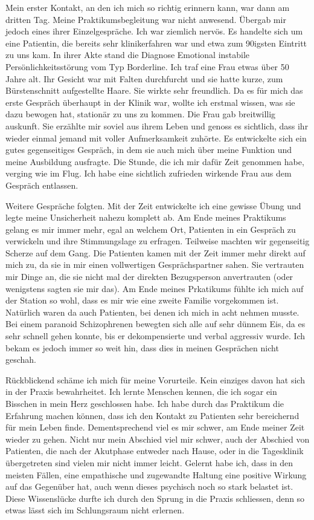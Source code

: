 Mein erster Kontakt, an den ich mich so richtig erinnern kann, war dann am dritten Tag. Meine Praktikumsbegleitung war nicht anwesend. Übergab mir jedoch eines ihrer Einzelgespräche. Ich war ziemlich nervös. Es handelte sich um eine Patientin, die bereits sehr klinikerfahren war und etwa zum 90igsten Eintritt zu uns kam. In ihrer Akte stand die Diagnose Emotional instabile Persönlichkeitsstörung vom Typ Borderline. Ich traf eine Frau etwas über 50 Jahre alt. Ihr Gesicht war mit Falten durchfurcht und sie hatte kurze, zum Bürstenschnitt aufgestellte Haare. Sie wirkte sehr freundlich. Da es für mich das erste Gespräch überhaupt in der Klinik war, wollte ich erstmal wissen, was sie dazu bewogen hat, stationär zu uns zu kommen. Die Frau gab breitwillig auskunft. Sie erzählte mir soviel aus ihrem Leben und genoss es sichtlich, dass ihr wieder einmal jemand mit voller Aufmerksamkeit zuhörte. Es entwickelte sich ein gutes gegenseitiges Gespräch, in dem sie auch mich über meine Funktion und meine Ausbildung ausfragte. Die Stunde, die ich mir dafür Zeit genommen habe, verging wie im Flug. Ich habe eine sichtlich zufrieden wirkende Frau aus dem Gespräch entlassen.

Weitere Gespräche folgten. Mit der Zeit entwickelte ich eine gewisse Übung und legte meine Unsicherheit nahezu komplett ab. Am Ende meines Praktikums gelang es mir immer mehr, egal an welchem Ort, Patienten in ein Gespräch zu verwickeln und ihre Stimmungslage zu erfragen. Teilweise machten wir gegenseitig Scherze auf dem Gang. Die Patienten kamen mit der Zeit immer mehr direkt auf mich zu, da sie in mir einen vollwertigen Gesprächspartner sahen. Sie vertrauten mir Dinge an, die sie nicht mal der direkten Bezugsperson anvertrauten (oder wenigstens sagten sie mir das). Am Ende meines Prkatikums fühlte ich mich auf der Station so wohl, dass es mir wie eine zweite Familie vorgekommen ist. Natürlich waren da auch Patienten, bei denen ich mich in acht nehmen musste. Bei einem paranoid Schizophrenen bewegten sich alle auf sehr dünnem Eis, da es sehr schnell gehen konnte, bis er dekompensierte und verbal aggressiv wurde. Ich bekam es jedoch immer so weit hin, dass dies in meinen Gesprächen nicht geschah.

Rückblickend schäme ich mich für meine Vorurteile. Kein einziges davon hat sich in der Praxis bewahrheitet. Ich lernte Menschen kennen, die ich sogar ein Bisschen in mein Herz geschlossen habe. Ich habe durch das Praktikum die Erfahrung machen können, dass ich den Kontakt zu Patienten sehr bereichernd für mein Leben finde. Dementsprechend viel es mir schwer, am Ende meiner Zeit wieder zu gehen. Nicht nur mein Abschied viel mir schwer, auch der Abschied von Patienten, die nach der Akutphase entweder nach Hause, oder in die Tagesklinik übergetreten sind vielen mir nicht immer leicht. Gelernt habe ich, dass in den meisten Fällen, eine empathische und zugewandte Haltung eine positive Wirkung auf das Gegenüber hat, auch wenn dieses psychisch noch so stark belastet ist. Diese Wissenslücke durfte ich durch den Sprung in die Praxis schliessen, denn so etwas lässt sich im Schlungsraum nicht erlernen. 

